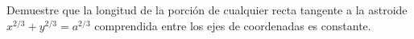 \item Demuestre que la longitud de la porción de cualquier recta tangente a la astroide $x^{2/3} + y^{2/3} = a^{2/3}$ comprendida entre los ejes de coordenadas es constante.
